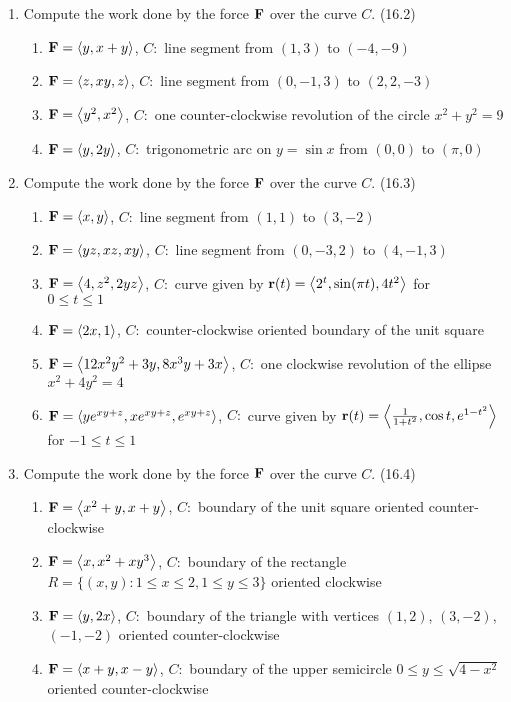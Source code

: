 \begin{enumerate}
    \item Compute the work done by the force $\mathbf{F}$ over the curve $C$. (16.2) %

      \begin{enumerate}
        \item $\mathbf{F}=\left<y,x+y\right>$, $C:$ line segment from $(1,3)$ to $(-4,-9)$
        \item $\mathbf{F}=\left<z,xy,z\right>$, $C:$ line segment from $(0,-1,3)$ to $(2,2,-3)$
        \item $\mathbf{F}=\left<y^2,x^2\right>$, $C:$ one counter-clockwise revolution of the circle $x^2+y^2=9$
        \item $\mathbf{F}=\left<y,2y\right>$, $C:$ trigonometric arc on $y=\sin x$ from $(0,0)$ to $(\pi,0)$
      \end{enumerate}

    \item Compute the work done by the force $\mathbf{F}$ over the curve $C$. (16.3) %

      \begin{enumerate}
        \item $\mathbf{F}=\left<x,y\right>$, $C:$ line segment from $(1,1)$ to $(3,-2)$
        \item $\mathbf{F}=\left<yz,xz,xy\right>$, $C:$ line segment from $(0,-3,2)$ to $(4,-1,3)$
        \item $\mathbf{F}=\left<4,z^2,2yz\right>$, $C:$ curve given by $\mathbf{r}(t)=\left<2^t,\sin (\pi t),4t^2\right>$ for \\ $0\leq t\leq 1$
        \item $\mathbf{F}=\left<2x,1\right>$, $C:$ counter-clockwise oriented boundary of the unit square
        \item $\mathbf{F}=\left<12x^2y^2+3y,8x^3y+3x\right>$, $C:$ one clockwise revolution of the ellipse $x^2+4y^2=4$
        \item $\mathbf{F}=\left<ye^{xy+z},xe^{xy+z},e^{xy+z}\right>$, $C:$ curve given by $\mathbf{r}(t)=\left<\frac{1}{1+t^2},\cos t,e^{1-t^2}\right>$ \\ for $-1 \leq t \leq 1$
      \end{enumerate}

    \newpage

    \item Compute the work done by the force $\mathbf{F}$ over the curve $C$. (16.4) %

      \begin{enumerate}
        \item $\mathbf{F}=\left<x^2+y,x+y\right>$, $C:$ boundary of the unit square oriented counter-clockwise
        \item $\mathbf{F}=\left<x,x^2+xy^3\right>$, $C:$ boundary of the rectangle \\$R = \{(x,y) : 1\leq x\leq 2, 1\leq y \leq 3\}$ oriented clockwise
        \item $\mathbf{F}=\left<y,2x\right>$, $C:$ boundary of the triangle with vertices $(1,2)$, $(3,-2)$, $(-1,-2)$ oriented counter-clockwise
        \item $\mathbf{F}=\left<x+y,x-y\right>$, $C:$ boundary of the upper semicircle $0\leq y\leq \sqrt{4-x^2}$ oriented counter-clockwise
      \end{enumerate}


\end{enumerate}
